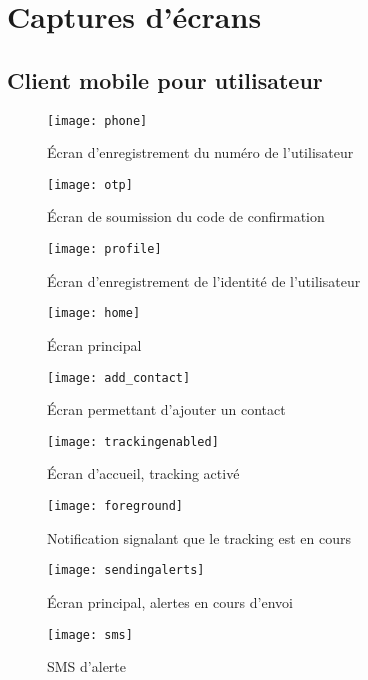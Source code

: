\section{Captures d’écrans}
\subsection{Client mobile pour utilisateur}

\begin{figure}[H]
	\centering
	\texttt{[image: phone]}
	\caption{Écran d’enregistrement du numéro de l’utilisateur}
\end{figure}

\begin{figure}[H]
	\centering
	\texttt{[image: otp]}
	\caption{Écran de soumission du code de confirmation}
\end{figure}

\begin{figure}[H]
	\centering
	\texttt{[image: profile]}
	\caption{Écran d’enregistrement de l’identité de l’utilisateur}
\end{figure}

\begin{figure}[H]
	\centering
	\texttt{[image: home]}
	\caption{Écran principal}
\end{figure}

\begin{figure}[H]
	\centering
	\texttt{[image: add\_contact]}
	\caption{Écran permettant d’ajouter un contact}
\end{figure}

\begin{figure}[H]
	\centering
	\texttt{[image: trackingenabled]}
	\caption{Écran d'accueil, tracking activé}
\end{figure}

\begin{figure}[H]
	\centering
	\texttt{[image: foreground]}
	\caption{Notification signalant que le tracking est en cours}
\end{figure}

\begin{figure}[H]
	\centering
	\texttt{[image: sendingalerts]}
	\caption{Écran principal, alertes en cours d’envoi}
\end{figure}

\begin{figure}[H]
	\centering
	\texttt{[image: sms]}
	\caption{SMS d’alerte}
\end{figure}


